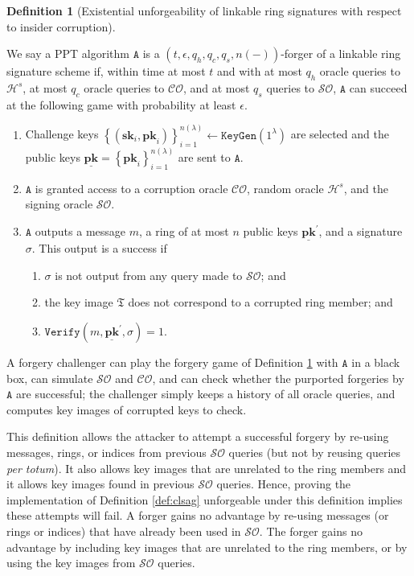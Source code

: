\documentclass{mrl}
\theoremstyle{plain}
\theoremstyle{definition}
\newtheorem{definition}{Definition}[section]
\begin{document}
\begin{definition}[Existential unforgeability of linkable ring signatures with respect to insider corruption]\label{def:unf}

We say a PPT algorithm $\texttt{A}$  is a $(t, \epsilon, q_h, q_c, q_s,  n(-))$-forger of a linkable ring signature scheme if, within time at most $t$ and with at most $q_h$ oracle queries to $\mathcal{H}^s$, at most $q_c$ oracle queries to $\mathcal{CO}$, and at most $q_s$ queries to $\mathcal{SO}$, $\texttt{A}$ can succeed at the following game with probability at least $\epsilon$.
\begin{enumerate}
\item Challenge keys $\left\{(\textbf{sk}_i, \textbf{pk}_i)\right\}_{i=1}^{n(\lambda)} \leftarrow \texttt{KeyGen}(1^\lambda)$ are selected and the public keys $\underline{\textbf{pk}} = \left\{\textbf{pk}_i\right\}_{i=1}^{n(\lambda)}$ are sent to $\texttt{A}$. 

\item $\texttt{A}$ is granted access to a corruption oracle $\mathcal{CO}$, random oracle $\mathcal{H}^s$, and the signing oracle $\mathcal{SO}$.

\item $\texttt{A}$ outputs a message $m$, a ring of at most $n$ public keys $\underline{\textbf{pk}}^\prime$, and a signature $\sigma$. This output is a success if
\begin{enumerate}
\item $\sigma$ is not output from any query made to $\mathcal{SO}$; and
\item the key image $\mathfrak{T}$ does not correspond to a corrupted ring member; and
\item $\texttt{Verify}(m, \underline{\textbf{pk}}^\prime, \sigma) = 1$.
\end{enumerate}
\end{enumerate}
\end{definition}

A forgery challenger can play the forgery game of Definition \ref{def:unf} with $\texttt{A}$ in a black box, can simulate $\mathcal{SO}$ and $\mathcal{CO}$, and can check whether the purported forgeries by $\texttt{A}$ are successful; the challenger simply keeps a history of all oracle queries, and computes key images of corrupted keys to check.

This definition allows the attacker to attempt a successful forgery by re-using messages, rings, or indices from previous $\mathcal{SO}$ queries (but not by reusing queries \textit{per totum}). It also allows key images that are unrelated to the ring members and it allows key images  found in previous $\mathcal{SO}$ queries. Hence, proving the implementation of Definition \ref{def:clsag} unforgeable under this definition implies these attempts will fail. A forger gains no advantage by re-using messages (or rings or indices) that have already been used in $\mathcal{SO}$. The forger gains no advantage by including key images that are unrelated to the ring members, or by using the key images from $\mathcal{SO}$ queries. 
\end{document}
